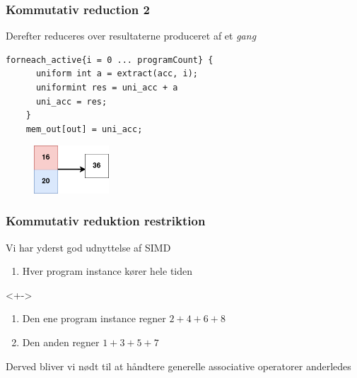 \documentclass[t]{beamer}
\begin{document}
\begin{frame}[fragile]
  \frametitle{Kommutativ reduction 2}
  Derefter reduceres over resultaterne produceret af et \textit{gang}
  \begin{lstlisting}[language=ispc]
    forneach_active{i = 0 ... programCount} {
      uniform int a = extract(acc, i);
      uniformint res = uni_acc + a
      uni_acc = res;
    }
    mem_out[out] = uni_acc;
\end{lstlisting}
  \begin{figure}[H]
    \centering
    \includegraphics[width=0.25\textwidth]{imgs/kom_reduce2.png}
  \end{figure}
\end{frame}

\begin{frame}
  \frametitle{Kommutativ reduktion restriktion}
  Vi har yderst god udnyttelse af SIMD
  \begin{enumerate}
    \item<+-> Hver program instance kører hele tiden
  \end{enumerate}
  <+->
  \begin{enumerate}
    \item<+-> Den ene program instance regner $2+4+6+8$
    \item<+-> Den anden regner $1+3+5+7$
  \end{enumerate}
  Derved bliver vi nødt til at håndtere generelle associative operatorer anderledes
\end{frame}
\end{document}

